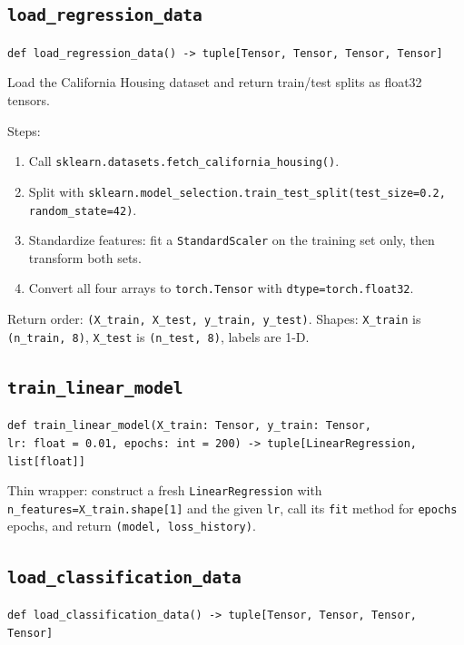 \documentclass[11pt]{article}
\newcommand{\code}[1]{\texttt{\small #1}}
\begin{document}
\subsection{\texttt{load\_regression\_data}}

\noindent
\code{def load\_regression\_data() -> tuple[Tensor, Tensor, Tensor, Tensor]}

\medskip\noindent
Load the California Housing dataset and return train/test splits as float32
tensors.

\medskip\noindent
Steps:
\begin{enumerate}
    \item Call \code{sklearn.datasets.fetch\_california\_housing()}.
    \item Split with \code{sklearn.model\_selection.train\_test\_split(test\_size=0.2,
          random\_state=42)}.
    \item Standardize features: fit a \code{StandardScaler} on the training set
          only, then transform both sets.
    \item Convert all four arrays to \code{torch.Tensor} with
          \code{dtype=torch.float32}.
\end{enumerate}

\noindent
Return order: \code{(X\_train, X\_test, y\_train, y\_test)}. Shapes:
\code{X\_train} is \code{(n\_train, 8)}, \code{X\_test} is \code{(n\_test, 8)},
labels are 1-D.

\subsection{\texttt{train\_linear\_model}}

\noindent
\code{def train\_linear\_model(X\_train: Tensor, y\_train: Tensor,\\
\hspace*{2em}lr: float = 0.01, epochs: int = 200) -> tuple[LinearRegression, list[float]]}

\medskip\noindent
Thin wrapper: construct a fresh \code{LinearRegression} with
\code{n\_features=X\_train.shape[1]} and the given \code{lr}, call its
\code{fit} method for \code{epochs} epochs, and return
\code{(model, loss\_history)}.

\subsection{\texttt{load\_classification\_data}}

\noindent
\code{def load\_classification\_data() -> tuple[Tensor, Tensor, Tensor, Tensor]}
\end{document}
